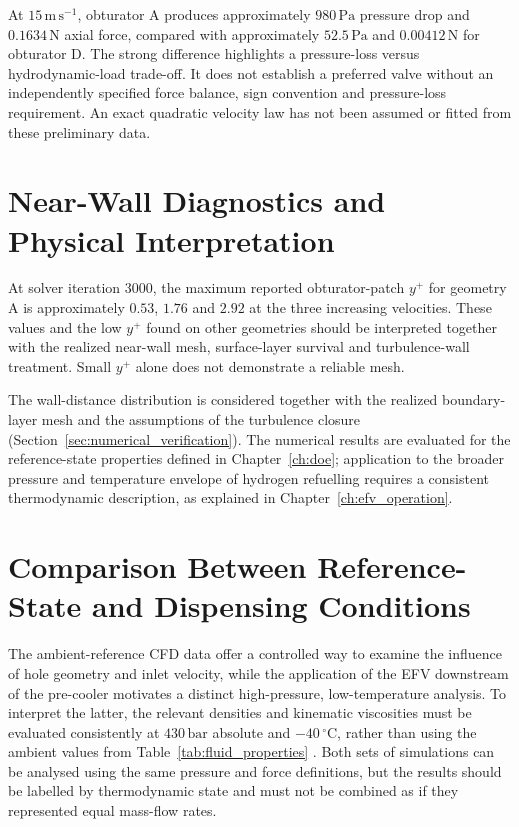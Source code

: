 At $15\,\mathrm{m\,s^{-1}}$, obturator A produces approximately $980\,\mathrm{Pa}$ pressure drop and $0.1634\,\mathrm{N}$ axial force, compared with approximately $52.5\,\mathrm{Pa}$ and $0.00412\,\mathrm{N}$ for obturator D. The strong difference highlights a pressure-loss versus hydrodynamic-load trade-off. It does not establish a preferred valve without an independently specified force balance, sign convention and pressure-loss requirement. An exact quadratic velocity law has not been assumed or fitted from these preliminary data.

\section{Near-Wall Diagnostics and Physical Interpretation}
\label{sec:near_wall_verification}

At solver iteration 3000, the maximum reported obturator-patch $y^+$ for geometry A is approximately $0.53$, $1.76$ and $2.92$ at the three increasing velocities. These values and the low $y^+$ found on other geometries should be interpreted together with the realized near-wall mesh, surface-layer survival and turbulence-wall treatment. Small $y^+$ alone does not demonstrate a reliable mesh.

The wall-distance distribution is considered together with the realized boundary-layer mesh and the assumptions of the turbulence closure (Section~\ref{sec:numerical_verification}). The numerical results are evaluated for the reference-state properties defined in Chapter~\ref{ch:doe}; application to the broader pressure and temperature envelope of hydrogen refuelling requires a consistent thermodynamic description, as explained in Chapter~\ref{ch:efv_operation}.


\section{Comparison Between Reference-State and Dispensing Conditions}
\label{sec:results_operating_states}

The ambient-reference CFD data offer a controlled way to examine the influence of hole geometry and inlet velocity, while the application of the EFV downstream of the pre-cooler motivates a distinct high-pressure, low-temperature analysis. To interpret the latter, the relevant densities and kinematic viscosities must be evaluated consistently at $430\,\mathrm{bar}$ absolute and $-40\,^{\circ}\mathrm{C}$, rather than using the ambient values from Table~\ref{tab:fluid_properties} \cite{nist_refprop_online}. Both sets of simulations can be analysed using the same pressure and force definitions, but the results should be labelled by thermodynamic state and must not be combined as if they represented equal mass-flow rates.

